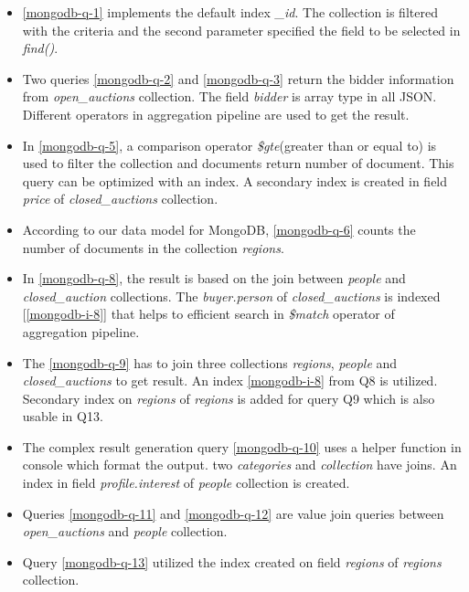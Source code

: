 \begin{itemize}
\item \ref{mongodb-q-1} implements the default index \textit{\_id}. The collection is filtered with the criteria and the second parameter specified the field to be selected in \textit{find()}. 

\item Two queries \ref{mongodb-q-2} and \ref{mongodb-q-3}  return the bidder information from \textit{open\_auctions} collection.  The field \textit{bidder} is array type in all JSON. Different operators in aggregation pipeline are used to get the result.

\item In \ref{mongodb-q-5}, a comparison operator \textit{\$gte}(greater than or equal to) is used to filter the collection and documents return number of document. This query can be optimized with an index. A secondary index is created in field \textit{price} of \textit{closed\_auctions} collection. 

\item According to our data model for MongoDB, \ref{mongodb-q-6} counts the number of documents in the collection \textit{regions}.

\item In \ref{mongodb-q-8}, the result is based on the join  between  \textit{people} and \textit{closed\_auction} collections. The \textit{buyer.person} of \textit{closed\_auctions} is indexed [\ref{mongodb-i-8}] that helps to efficient search in \textit{\$match} operator of aggregation pipeline.
 \item 
The  \ref{mongodb-q-9} has to join  three collections \textit{regions}, \textit{people} and \textit{closed\_auctions} to get result.  An index \ref{mongodb-i-8} from Q8 is utilized. Secondary index on \textit{regions} of \textit{regions}  is added for query Q9 which is also usable in Q13. 

\item The complex result generation query \ref{mongodb-q-10} uses a helper function in console which format the output. two \textit{categories} and \textit{collection}  have joins. An index  
in field \textit{profile.interest} of \textit{people} collection is created. 

\item Queries \ref{mongodb-q-11} and \ref{mongodb-q-12} are value join queries between \textit{open\_auctions} and \textit{people} collection. 

\item Query \ref{mongodb-q-13} utilized the index created on field \textit{regions} of \textit{regions} collection. 


\end{itemize}
